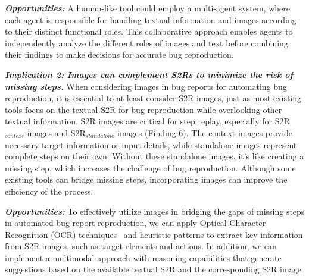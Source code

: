 \textbf{\textit{Opportunities:}} A human-like tool could employ a multi-agent system, where each agent is responsible for handling textual information and images according to their distinct functional roles. This collaborative approach enables agents to independently analyze the different roles of images and text before combining their findings to make decisions for accurate bug reproduction.


\noindent
\textbf{\emph{Implication 2: Images can complement S2Rs to minimize the risk of missing steps.}}
When considering images in bug reports for automating bug reproduction, it is essential to at least consider S2R images, just as most existing tools focus on the textual S2R for bug reproduction while overlooking other textual information. S2R images are critical for step replay, especially for S2R$_{context}$ images and S2R$_{standalone}$ images
(Finding 6). 
The context images provide necessary target information or input details, while standalone images represent complete steps on their own. Without these standalone images, it's like creating a missing step, which increases the challenge of bug reproduction. Although some existing tools can bridge missing steps, incorporating images can improve the efficiency of the process. 


\textbf{\textit{Opportunities:}} 
To effectively utilize images in bridging the gaps of missing steps in automated bug report reproduction, we can apply Optical Character Recognition (OCR) techniques~\cite{mittal2020text} and heuristic patterns to extract key information from S2R images, such as target elements and actions. 
In addition, we can implement a multimodal approach with reasoning capabilities that generate suggestions based on the available textual S2R and the corresponding S2R image.

